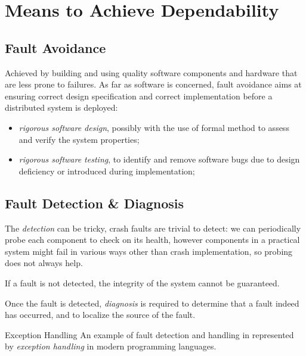\documentclass[11pt, a4paper]{article}
\begin{document}
\section{Means to Achieve Dependability}\label{sec:means_to_achieve_dependability} %
\subsection{Fault Avoidance}\label{sub:fault_avoidance} %
Achieved by building and using quality software components and hardware that are less prone to failures.
As far as software is concerned, fault avoidance aims at ensuring correct design specification and correct implementation before a distributed system is deployed:
\begin{itemize}
    \item \textit{rigorous software design}, possibly with the use of formal method to assess and verify the system properties;
    \item \textit{rigorous software testing}, to identify and remove software bugs due to design deficiency or introduced during implementation;
\end{itemize}
\subsection{Fault Detection \& Diagnosis}\label{sub:fault_detection_diagnosis} %
The \textit{detection} can be tricky, crash faults are trivial to detect: we can periodically probe each component to check on its health, however components in a practical system might fail in various ways other than crash implementation, so probing does not always help.
\begin{note}
    If a fault is not detected, the integrity of the system cannot be guaranteed.
\end{note}
Once the fault is detected, \textit{diagnosis} is required to determine that a fault indeed has occurred, and to localize the source of the fault.
\begin{example}{Exception Handling}{}
    An example of fault detection and handling in represented by \textit{exception handling} in modern programming languages.
\end{example}
\end{document}
